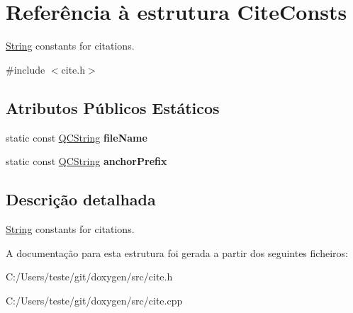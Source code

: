 \hypertarget{struct_cite_consts}{\section{Referência à estrutura Cite\-Consts}
\label{struct_cite_consts}
}


\hyperlink{class_string}{String} constants for citations.  




{\ttfamily \#include $<$cite.\-h$>$}

\subsection*{Atributos Públicos Estáticos}
\begin{DoxyCompactItemize}
\item 
\hypertarget{struct_cite_consts_ac737530792e4fe46ec52288e6df290aa}{static const \hyperlink{class_q_c_string}{Q\-C\-String} {\bfseries file\-Name}}\label{struct_cite_consts_ac737530792e4fe46ec52288e6df290aa}

\item 
\hypertarget{struct_cite_consts_a0ff66553e77cd721fdbd3e73a97ee65b}{static const \hyperlink{class_q_c_string}{Q\-C\-String} {\bfseries anchor\-Prefix}}\label{struct_cite_consts_a0ff66553e77cd721fdbd3e73a97ee65b}

\end{DoxyCompactItemize}


\subsection{Descrição detalhada}
\hyperlink{class_string}{String} constants for citations. 

A documentação para esta estrutura foi gerada a partir dos seguintes ficheiros\-:\begin{DoxyCompactItemize}
\item 
C\-:/\-Users/teste/git/doxygen/src/cite.\-h\item 
C\-:/\-Users/teste/git/doxygen/src/cite.\-cpp\end{DoxyCompactItemize}
